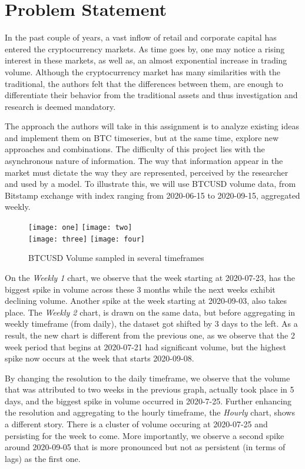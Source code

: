 \section{Problem Statement}

In the past couple of years, a vast inflow of retail and corporate capital has entered the cryptocurrency markets. As time goes by, one may notice a rising interest in these markets, as well as, an almost exponential increase in trading volume. Although the cryptocurrency
market has many similarities with the traditional, the authors felt that the differences between them, are enough to differentiate their behavior from the traditional assets and thus investigation and research is deemed mandatory.

The approach the authors will take in this assignment is to analyze existing ideas and implement them on BTC timeseries, but at the same time, explore new approaches and combinations. The difficulty of this project lies with the asynchronous nature of information.
The way that information appear in the market must dictate the way they are represented, perceived by the researcher and used by a model. To illustrate this, we will use BTCUSD volume data, from Bitstamp exchange with index ranging from 2020-06-15 to 2020-09-15, aggregated weekly.

\begin{figure}[h]
	\centering
    \texttt{[image: one]}
    \texttt{[image: two]}
    \\[\smallskipamount]
    \texttt{[image: three]}
    \texttt{[image: four]}
    \caption{BTCUSD Volume sampled in several timeframes}\label{fig:example}
\end{figure}


On the \textit{Weekly 1} chart, we observe that the week starting at 2020-07-23, has the biggest spike in volume across these 3 months while the next weeks exhibit declining volume. Another spike at
the week starting at 2020-09-03, also takes place. The \textit{Weekly 2} chart, is drawn on the same data, but before aggregating in weekly
timeframe (from daily), the dataset got shifted by 3 days to the left. As a result, the new chart is different from the previous one, as we observe
that the 2 week period that begins at 2020-07-21 had significant volume, but the highest spike now occurs at the week that starts 2020-09-08.

By changing the resolution to the daily timeframe, we observe that the volume that was attributed to two weeks in the previous graph, actually took place in 5 days, and the biggest spike in volume occurred in 2020-7-25. Further enhancing the resolution and aggregating to the hourly timeframe, the \textit{Hourly} chart,
shows a different story. There is a cluster of volume occuring at 2020-07-25 and persisting for
the week to come. More importantly, we observe a second spike around 2020-09-05 that is more pronounced but not as persistent (in terms of lags) as the first one.

